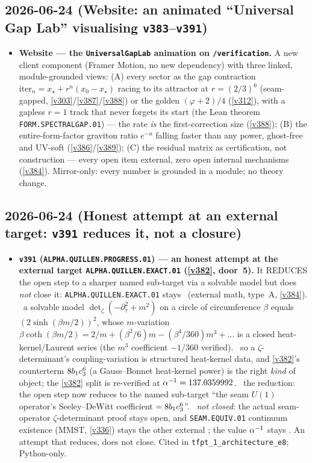 \subsection*{2026-06-24 (Website: an animated ``Universal Gap Lab'' visualising \texttt{v383}--\texttt{v391})}
\begin{itemize}
\item \textbf{Website --- the \texttt{UniversalGapLab} animation on \texttt{/verification}.} A new client
component (Framer Motion, no new dependency) with three linked, module-grounded views: (A) every sector as the
gap contraction $\mathrm{iter}_n=x_\star+r^n(x_0-x_\star)$ racing to its attractor at $r=(2/3)^6$ (seam-gapped,
\vref{v303}/\vref{v387}/\vref{v388}) or the golden $(\varphi+2)/4$ (\vref{v312}), with a gapless $r=1$ track that
never forgets its start (the Lean theorem \texttt{FORM.SPECTRALGAP.01}) --- the rate \emph{is} the first-correction
size (\vref{v388}); (B) the entire-form-factor graviton ratio $e^{-u}$ falling faster than any power, ghost-free and
UV-soft (\vref{v386}/\vref{v389}); (C) the residual matrix as certification, not construction --- every open item
external, zero open internal mechanisms (\vref{v384}). Mirror-only: every number is grounded in a module; no theory
change.
\end{itemize}

\subsection*{2026-06-24 (Honest attempt at an external target: \texttt{v391} reduces it, not a closure)}
\begin{itemize}
\item \textbf{\texttt{v391} (\texttt{ALPHA.QUILLEN.PROGRESS.01}) --- an honest attempt at the external target
\texttt{ALPHA.QUILLEN.EXACT.01} (\vref{v382}, door~5).} It REDUCES the open step to a sharper named sub-target via a
solvable model but does \emph{not} close it: \texttt{ALPHA.QUILLEN.EXACT.01} stays \mO\ (external math, type~A,
\vref{v384}). \mE\ a solvable model $\det_\zeta(-\partial_\tau^2+m^2)$ on a circle of circumference $\beta$ equals
$(2\sinh(\beta m/2))^2$, whose $m$-variation $\beta\coth(\beta m/2)=2/m+(\beta^2/6)m-(\beta^4/360)m^3+\dots$ is a closed
heat-kernel/Laurent series (the $m^3$ coefficient $-1/360$ verified). \mE\ so a $\zeta$-determinant's coupling-variation
is structured heat-kernel data, and \vref{v382}'s counterterm $8b_1c_3^6$ (a Gauss--Bonnet heat-kernel power) is the
right \emph{kind} of object; the \vref{v382} split is re-verified at $\alpha^{-1}=137.0359992$. \mE\ the reduction: the open
step now reduces to the named sub-target ``the seam $U(1)$ operator's Seeley--DeWitt coefficient $=8b_1c_3^6$''.
\mO\ \emph{not closed}: the actual seam-operator $\zeta$-determinant proof stays open, and \texttt{SEAM.EQUIV.01}
continuum existence (MMST, \vref{v336}) stays the other external \mO; the value $\alpha^{-1}$ stays \mE. An attempt that
reduces, does not close. Cited in \texttt{tfpt\_1\_architecture\_e8}; Python-only.
\end{itemize}

